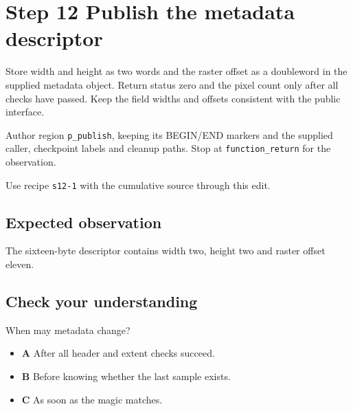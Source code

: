 \section{Step 12 Publish the metadata descriptor}\label{ppm-s12}

Store width and height as two words and the raster offset as a doubleword in the supplied metadata object. Return status zero and the pixel count only after all checks have passed. Keep the field widths and offsets consistent with the public interface.

Author region \texttt{p\_publish}, keeping its BEGIN/END markers and the supplied caller, checkpoint labels and cleanup paths. Stop at \texttt{function\_return} for the observation.

Use recipe \texttt{s12-1} with the cumulative source through this edit.

\subsection{Expected observation}
The sixteen-byte descriptor contains width two, height two and raster offset eleven.

\subsection{Check your understanding}
When may metadata change?

\begin{itemize}
  \item \textbf{A} After all header and extent checks succeed.
  \item \textbf{B} Before knowing whether the last sample exists.
  \item \textbf{C} As soon as the magic matches.
\end{itemize}
